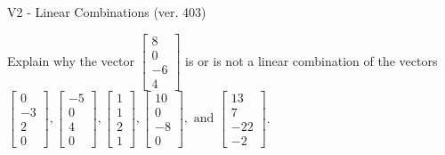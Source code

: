\begin{exercise}
  \begin{exerciseTitle}V2 - Linear Combinations (ver. 403)\end{exerciseTitle}
  \begin{exerciseStatement}
    Explain why the vector \(\left[\begin{array}{c}
8 \\
0 \\
-6 \\
4
\end{array}\right]\)  is or is not a linear 
	combination of the vectors \(\left[\begin{array}{c}
0 \\
-3 \\
2 \\
0
\end{array}\right] , \left[\begin{array}{c}
-5 \\
0 \\
4 \\
0
\end{array}\right] , \left[\begin{array}{c}
1 \\
1 \\
2 \\
1
\end{array}\right] , \left[\begin{array}{c}
10 \\
0 \\
-8 \\
0
\end{array}\right] , \text{ and } \left[\begin{array}{c}
13 \\
7 \\
-22 \\
-2
\end{array}\right]\).
	



\end{exerciseStatement}
\end{exercise}
